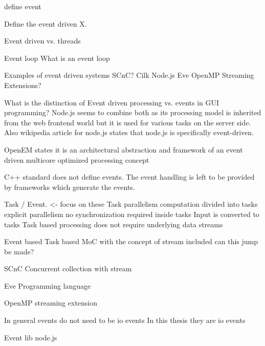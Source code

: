 define event

Define the event driven X.

Event driven vs. threads


Event loop
What is an event loop

Examples of event driven systems
SCnC?
Cilk
Node.js
Eve \cite{fonseca2014eve}
OpenMP Streaming Extensions? \cite{pop2011stream}

What is the distinction of Event driven processing vs. events in GUI programming? Node.js seems to combine both as its processing model is inherited from the web frontend world but it is used for various tasks on the server side. Also wikipedia article for node.js states that node.js is specifically event-driven.

OpenEM states it is an architectural abstraction and framework of an event driven multicore optimized processing concept

C++ standard does not define events. The event handling is left to be provided by frameworks which generate the events.

Task / Event. <- focus on these
  Task parallelism
    computation divided into tasks
    explicit parallelism
    no synchronization required inside tasks
  Input is converted to tasks
  Task based processing does not require underlying data streams

Event based 
  Task based MoC with the concept of stream included
  can this jump be made?

SCnC
  Concurrent collection with stream

Eve
  Programming language

OpenMP streaming extension

In general events do not need to be io events
  In this thesis they are io events

Event lib
node.js

